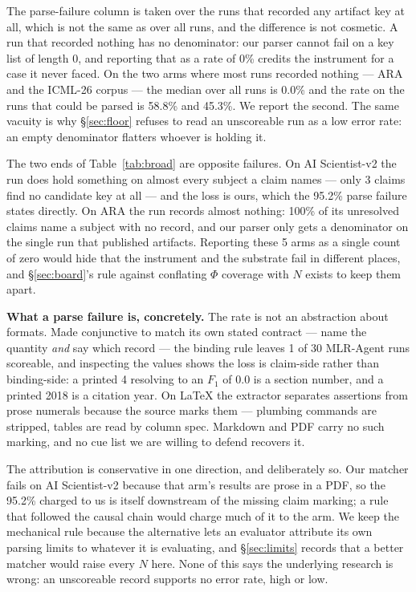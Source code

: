 \documentclass[10pt]{article}
\newcommand{\RM}[1]{{#1}}
\begin{document}
\noindent The parse-failure column is taken over the runs that recorded any
artifact key at all, which is not the same as over all runs, and the difference
is not cosmetic. A run that recorded nothing has no denominator: our parser
cannot fail on a key list of length \RM{0}, and reporting that as a rate of
\RM{0\%} credits the instrument for a case it never faced. On the two arms where
most runs recorded nothing --- ARA and the ICML-26 corpus --- the median over
all runs is \RM{0.0\%} and the rate on the runs that could be parsed is
\RM{58.8\%} and \RM{45.3\%}. We report the second. The same vacuity is why
\S\ref{sec:floor} refuses to read an unscoreable run as a low error rate: an
empty denominator flatters whoever is holding it.

\noindent The two ends of Table~\ref{tab:broad} are opposite failures. On AI Scientist-v2
the run does hold something on almost every subject a claim names --- only
\RM{3} claims find no candidate key at all --- and the loss is ours, which the
\RM{95.2\%} parse failure states directly. On ARA the run records almost
nothing: \RM{100\%} of its unresolved claims name a subject with no record,
and our parser only gets a denominator on the single run that published
artifacts. Reporting these \RM{5} arms as a single count of zero would hide that
the instrument and the substrate fail in different places, and
\S\ref{sec:board}'s rule against conflating $\Phi$ coverage with $N$ exists to
keep them apart.

\textbf{What a parse failure is, concretely.} The rate is not an abstraction
about formats. Made conjunctive to match its own stated contract --- name the
quantity \emph{and} say which record --- the binding rule leaves \RM{1} of
\RM{30} MLR-Agent runs scoreable, and inspecting the values shows the loss is
claim-side rather than binding-side: a printed \RM{4} resolving to an $F_1$ of
\RM{0.0} is a section number, and a printed \RM{2018} is a citation year. On
\LaTeX{} the extractor separates assertions from prose numerals because the
source marks them --- plumbing commands are stripped, tables are read by column
spec. Markdown and PDF carry no such marking, and no cue list we are willing to
defend recovers it.

The attribution is conservative in one direction, and deliberately so. Our
matcher fails on AI Scientist-v2 because that arm's results are prose in a PDF,
so the \RM{95.2\%} charged to us is itself downstream of the missing claim
marking; a rule that followed the causal chain would charge much of it to the
arm. We keep the mechanical rule because the alternative lets an evaluator
attribute its own parsing limits to whatever it is evaluating, and \S\ref{sec:limits}
records that a better matcher would raise every $N$ here. None of this says the
underlying research is wrong: an unscoreable record supports no error rate,
high or low.
\end{document}
